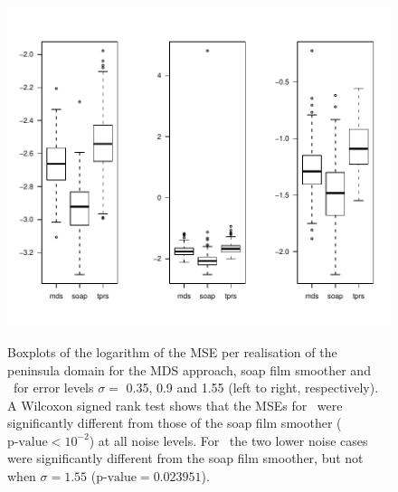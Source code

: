 {%
\begin{figure}
\centering
\includegraphics[width=6in, trim=0in 0.5in 0in 0in]{mds/figs/mds-wt2-boxplot.pdf} \\
\caption{Boxplots of the logarithm of the MSE per realisation of the peninsula domain for the MDS approach, soap film smoother and \tprs\ for error levels $\sigma=$ 0.35, 0.9 and 1.55 (left to right, respectively). A Wilcoxon signed rank test shows that the MSEs for \tprs\ were significantly different from those of the soap film smoother ($\text{p-value} < 10^{-2}$) at all noise levels. For \mdsap\ the two lower noise cases were significantly different from the soap film smoother, but not when $\sigma=1.55$ ($\text{p-value} = 0.023951$).}
\label{mds-wt2-boxplot}
\end{figure}

}
